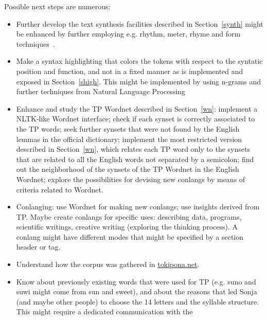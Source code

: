 Possible next steps are numerous:
\begin{itemize}
  \item Further develop the text synthesis facilities described in
    Section~\ref{synth} might be enhanced by further employing e.g.
    rhythm, meter, rhyme and form techniques~\cite{wikiPoetry}.
  \item Make a syntax highlighting that colors the tokens with respect
    to the syntatic position and function, and not in a fixed manner
    as is implemented and exposed in Section~\ref{shigh}.
    This might be implemented by using n-grams and
    further techniques from Natural Language Processing
  \item Enhance and study the TP Wordnet described in Section~\ref{wn}:
    implement a NLTK-like Wordnet interface; check if each synset
    is correctly associated to the TP words; seek further synsets
    that were not found by the English lemmas in the official
    dictionary; implement the most restricted version described in
    Section~\ref{wn}, which relates each TP word only to the synsets
    that are related to all the English words not separated by a
    semicolon; find out the neighborhood of the synsets of the TP
    Wordnet in the English Wordnet; explore the possibilities for
    devising new conlangs by means of criteria related to Wordnet.
  \item Conlanging: use Wordnet for making new conlangs;
    use insights derived from TP.
    Maybe create conlangs for specific uses:
    describing data, programs,
    scientific writings, creative writing
    (exploring the thinking process).
    A conlang might have different modes that might 
    be specified by a section header or tag. 
  \item Understand how the corpus was gathered in \url{tokipona.net}.
  \item Know about previously existing words that were used for TP
    (e.g. suno and suwi might come from sun and sweet),
    and about the reasons that led Sonja (and maybe other people)
    to choose the 14 letters and the syllable structure.
    This might require a dedicated communication with the

\end{itemize}
